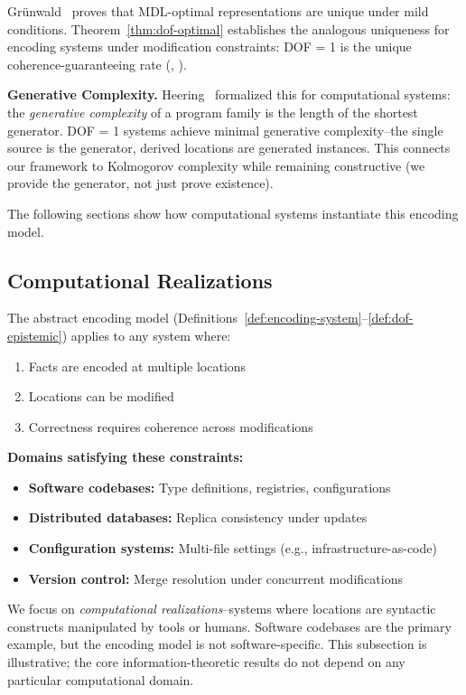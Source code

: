 Grünwald~\cite{gruenwald2007mdl} proves that MDL-optimal representations are unique under mild conditions. Theorem~\ref{thm:dof-optimal} establishes the analogous uniqueness for encoding systems under modification constraints: DOF = 1 is the unique coherence-guaranteeing rate (, ).

\textbf{Generative Complexity.} Heering~\cite{heering2015generative} formalized this for computational systems: the \emph{generative complexity} of a program family is the length of the shortest generator. DOF = 1 systems achieve minimal generative complexity--the single source is the generator, derived locations are generated instances. This connects our framework to Kolmogorov complexity while remaining constructive (we provide the generator, not just prove existence).

The following sections show how computational systems instantiate this encoding model.


\subsection{Computational Realizations}\label{sec:edit-space}

The abstract encoding model (Definitions~\ref{def:encoding-system}--\ref{def:dof-epistemic}) applies to any system where:
\begin{enumerate}
\tightlist
\item Facts are encoded at multiple locations
\item Locations can be modified
\item Correctness requires coherence across modifications
\end{enumerate}

\textbf{Domains satisfying these constraints:}
\begin{itemize}
\tightlist
\item \textbf{Software codebases:} Type definitions, registries, configurations
\item \textbf{Distributed databases:} Replica consistency under updates
\item \textbf{Configuration systems:} Multi-file settings (e.g., infrastructure-as-code)
\item \textbf{Version control:} Merge resolution under concurrent modifications
\end{itemize}

We focus on \emph{computational realizations}--systems where locations are syntactic constructs manipulated by tools or humans. Software codebases are the primary example, but the encoding model is not software-specific. This subsection is illustrative; the core information-theoretic results do not depend on any particular computational domain.

